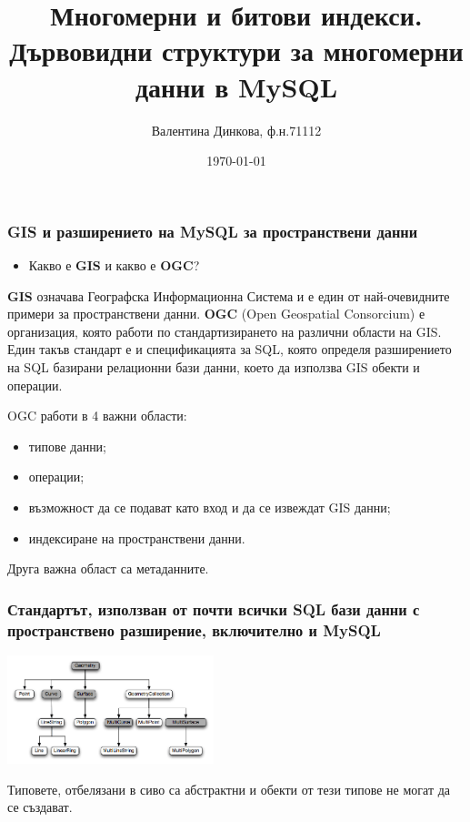 \documentclass{beamer}
\title[Mногомерни данни в MySQL]{Многомерни и битови индекси. Дървовидни структури за многомерни данни в MySQL}
\author{Валентина Динкова, ф.н.71112}
\institute{ФМИ}
\date{\today}
\begin{document}
\begin{frame}
  \titlepage
\end{frame}

\begin{frame}
  \frametitle{GIS и разширението на MySQL за пространствени данни}
\begin{itemize}
 \item Какво е \textbf{GIS} и какво е \textbf{OGC}?
\end{itemize}
\textbf{GIS} означава Географска Информационна Система и е един от най-очевидните примери за пространствени данни.
\newline
\newline
\textbf{OGC} (Open Geospatial Consorcium) е организация, която работи по стандартизирането на различни области на GIS.
Един такъв стандарт е и спецификацията за SQL, която определя разширението на SQL базирани релационни бази данни,
 което да използва GIS обекти и операции.
\end{frame}

\begin{frame}
 OGC работи в 4 важни области:
\begin{itemize}
 \item типове данни;
 \item операции;
 \item възможност да се подават като вход и да се извеждат GIS данни;
 \item индексиране на пространствени данни.
\end{itemize}
Друга важна област са метаданните.
\end{frame}

\begin{frame}
\frametitle{Стандартът, използван от почти всички SQL бази данни с пространствено разширение, включително и MySQL}
\begin{center}
\includegraphics[width=60mm]{gis-datatypes.png}\end{center}
Типовете, отбелязани в сиво са абстрактни и обекти от тези типове не могат да се създават.
\end{frame}
\end{document}
